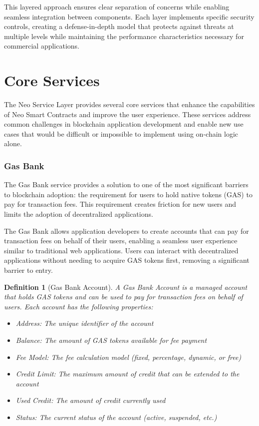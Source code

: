 \documentclass[11pt]{article}
\newtheorem{definition}{Definition}
\begin{document}
This layered approach ensures clear separation of concerns while enabling seamless integration between components. Each layer implements specific security controls, creating a defense-in-depth model that protects against threats at multiple levels while maintaining the performance characteristics necessary for commercial applications.

\section{Core Services}
\label{subsec:nsl-core-services}

The Neo Service Layer provides several core services that enhance the capabilities of Neo Smart Contracts and improve the user experience. These services address common challenges in blockchain application development and enable new use cases that would be difficult or impossible to implement using on-chain logic alone.

\subsubsection{Gas Bank}
\label{subsubsec:gas-bank}

The Gas Bank service provides a solution to one of the most significant barriers to blockchain adoption: the requirement for users to hold native tokens (GAS) to pay for transaction fees. This requirement creates friction for new users and limits the adoption of decentralized applications.



The Gas Bank allows application developers to create accounts that can pay for transaction fees on behalf of their users, enabling a seamless user experience similar to traditional web applications. Users can interact with decentralized applications without needing to acquire GAS tokens first, removing a significant barrier to entry.

\begin{definition}[Gas Bank Account]
A Gas Bank Account is a managed account that holds GAS tokens and can be used to pay for transaction fees on behalf of users. Each account has the following properties:
\begin{itemize}
    \item Address: The unique identifier of the account
    \item Balance: The amount of GAS tokens available for fee payment
    \item Fee Model: The fee calculation model (fixed, percentage, dynamic, or free)
    \item Credit Limit: The maximum amount of credit that can be extended to the account
    \item Used Credit: The amount of credit currently used
    \item Status: The current status of the account (active, suspended, etc.)
\end{itemize}
\end{definition}
\end{document}
